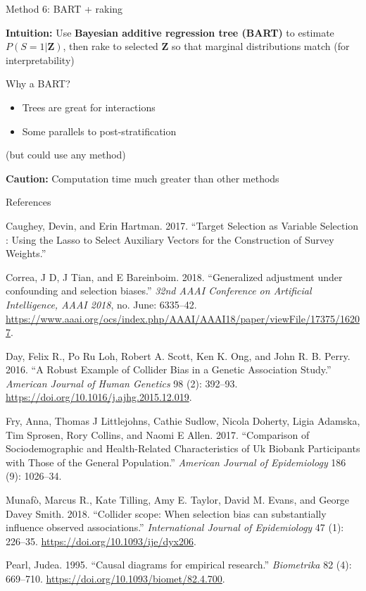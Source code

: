 \documentclass[
  ignorenonframetext,
]{beamer}
\providecommand{\tightlist}{%
  \setlength{\itemsep}{0pt}\setlength{\parskip}{0pt}}
\begin{document}
\begin{frame}{Method 6: BART + raking}
\protect\hypertarget{method-6-bart-raking}{}

\textbf{Intuition:} Use \textbf{Bayesian additive regression tree
(BART)} to estimate \(P(S = 1 | \mathbf{Z})\), then rake to selected
\(\mathbf{Z}\) so that marginal distributions match (for
interpretability)

Why a BART?

\begin{itemize}
\tightlist
\item
  Trees are great for interactions
\item
  Some parallels to post-stratification
\end{itemize}

(but could use any method)

\textbf{Caution:} Computation time much greater than other methods

\end{frame}

\begin{frame}[allowframebreaks]{References}
\protect\hypertarget{references}{}

\small

\hypertarget{refs}{}
\leavevmode\hypertarget{ref-Caughey2017}{}%
Caughey, Devin, and Erin Hartman. 2017. ``Target Selection as Variable
Selection : Using the Lasso to Select Auxiliary Vectors for the
Construction of Survey Weights.''

\leavevmode\hypertarget{ref-Correa2018}{}%
Correa, J D, J Tian, and E Bareinboim. 2018. ``Generalized adjustment
under confounding and selection biases.'' \emph{32nd AAAI Conference on
Artificial Intelligence, AAAI 2018}, no. June: 6335--42.
\url{https://www.aaai.org/ocs/index.php/AAAI/AAAI18/paper/viewFile/17375/16207}.

\leavevmode\hypertarget{ref-Day2016}{}%
Day, Felix R., Po Ru Loh, Robert A. Scott, Ken K. Ong, and John R. B.
Perry. 2016. ``A Robust Example of Collider Bias in a Genetic
Association Study.'' \emph{American Journal of Human Genetics} 98 (2):
392--93. \url{https://doi.org/10.1016/j.ajhg.2015.12.019}.

\leavevmode\hypertarget{ref-fry2017comparison}{}%
Fry, Anna, Thomas J Littlejohns, Cathie Sudlow, Nicola Doherty, Ligia
Adamska, Tim Sprosen, Rory Collins, and Naomi E Allen. 2017.
``Comparison of Sociodemographic and Health-Related Characteristics of
Uk Biobank Participants with Those of the General Population.''
\emph{American Journal of Epidemiology} 186 (9): 1026--34.

\leavevmode\hypertarget{ref-Munafo2018}{}%
Munafò, Marcus R., Kate Tilling, Amy E. Taylor, David M. Evans, and
George Davey Smith. 2018. ``Collider scope: When selection bias can
substantially influence observed associations.'' \emph{International
Journal of Epidemiology} 47 (1): 226--35.
\url{https://doi.org/10.1093/ije/dyx206}.

\leavevmode\hypertarget{ref-Pearl1995}{}%
Pearl, Judea. 1995. ``Causal diagrams for empirical research.''
\emph{Biometrika} 82 (4): 669--710.
\url{https://doi.org/10.1093/biomet/82.4.700}.

\end{frame}
\end{document}
